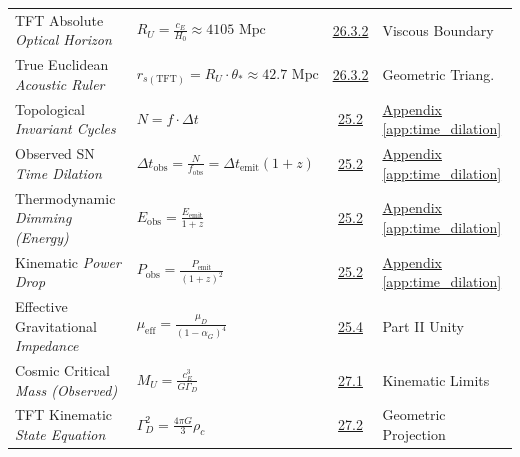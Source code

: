 \begin{longtable}{@{} p{4.5cm} p{6cm} c p{4cm} @{}}
TFT Absolute \newline \textit{Optical Horizon} & $R_U = \frac{c_E}{H_0} \approx 4105 \text{ Mpc}$ & \hyperref[sec:26.3.2]{26.3.2} & Viscous Boundary \\

True Euclidean \newline \textit{Acoustic Ruler} & $r_{s(\text{TFT})} = R_U \cdot \theta_* \approx 42.7 \text{ Mpc}$ & \hyperref[sec:26.3.2]{26.3.2} & Geometric Triang. \\

Topological \newline \textit{Invariant Cycles} & $N = f \cdot \Delta t$ & \hyperref[sec:25.2]{25.2} & \hyperref[app:time_dilation]{Appendix \ref*{app:time_dilation}} \\

Observed SN \newline \textit{Time Dilation} & $\Delta t_{\text{obs}} = \frac{N}{f_{\text{obs}}} = \Delta t_{\text{emit}} (1+z)$ & \hyperref[sec:25.2]{25.2} & \hyperref[app:time_dilation]{Appendix \ref*{app:time_dilation}} \\

Thermodynamic \newline \textit{Dimming (Energy)} & $E_{\text{obs}} = \frac{E_{\text{emit}}}{1+z}$ & \hyperref[sec:25.2]{25.2} & \hyperref[app:time_dilation]{Appendix \ref*{app:time_dilation}} \\

Kinematic \newline \textit{Power Drop} & $P_{\text{obs}} = \frac{P_{\text{emit}}}{(1+z)^2}$ & \hyperref[sec:25.2]{25.2} & \hyperref[app:time_dilation]{Appendix \ref*{app:time_dilation}} \\

Effective Gravitational \newline \textit{Impedance} & $\mu_{\text{eff}} = \frac{\mu_D}{(1-\alpha_G)^4}$ & \hyperref[sec:25.4]{25.4} & Part II Unity \\

Cosmic Critical \newline \textit{Mass (Observed)} & $M_U = \frac{c_E^3}{G \Gamma_D}$ & \hyperref[sec:27.1]{27.1} & Kinematic Limits \\

TFT Kinematic \newline \textit{State Equation} & $\Gamma_D^2 = \frac{4\pi G}{3} \rho_c$ & \hyperref[sec:27.2]{27.2} & Geometric Projection \\


\end{longtable}
